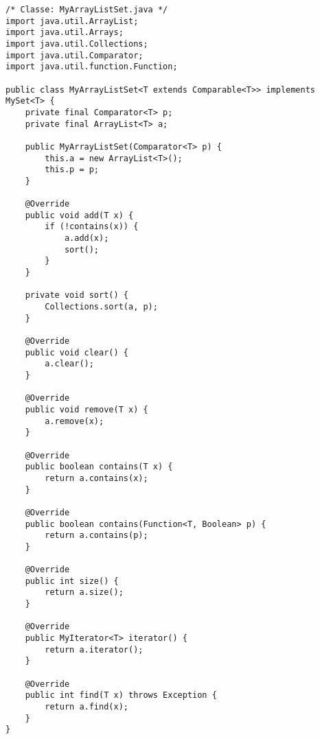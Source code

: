 \begin{lstlisting}[basicstyle=\small,]
/* Classe: MyArrayListSet.java */
import java.util.ArrayList;
import java.util.Arrays;
import java.util.Collections;
import java.util.Comparator;
import java.util.function.Function;

public class MyArrayListSet<T extends Comparable<T>> implements MySet<T> {
    private final Comparator<T> p;
    private final ArrayList<T> a;

    public MyArrayListSet(Comparator<T> p) {
        this.a = new ArrayList<T>();
        this.p = p;
    }

    @Override
    public void add(T x) {
        if (!contains(x)) {
            a.add(x);
            sort();
        }
    }

    private void sort() {
        Collections.sort(a, p);
    }

    @Override
    public void clear() {
        a.clear();
    }

    @Override
    public void remove(T x) {
        a.remove(x);
    }

    @Override
    public boolean contains(T x) {
        return a.contains(x);
    }

    @Override
    public boolean contains(Function<T, Boolean> p) {
        return a.contains(p);
    }

    @Override
    public int size() {
        return a.size();
    }

    @Override
    public MyIterator<T> iterator() {
        return a.iterator();
    }

    @Override
    public int find(T x) throws Exception {
        return a.find(x);
    }
}
\end{lstlisting}





